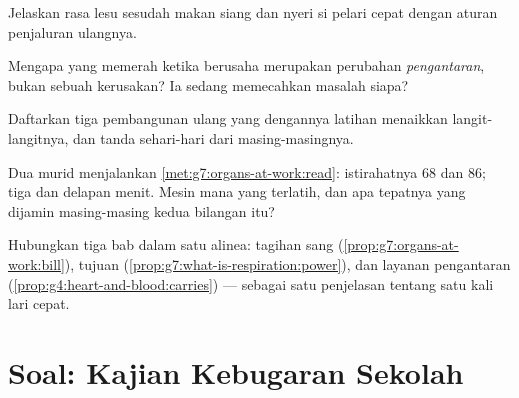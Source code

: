 \begin{exercise}[$\star\star$]\label{exo:g7:organs-at-work:8}
Jelaskan rasa lesu sesudah makan siang dan nyeri  si pelari
cepat dengan aturan penjaluran ulangnya.
\end{exercise}

\begin{exercise}[$\star\star$]\label{exo:g7:organs-at-work:9}
Mengapa  yang memerah ketika berusaha merupakan perubahan
\emph{pengantaran}, bukan sebuah kerusakan? Ia sedang memecahkan
masalah siapa?
\end{exercise}

\begin{exercise}[$\star\star$]\label{exo:g7:organs-at-work:10}
Daftarkan tiga pembangunan ulang yang dengannya latihan menaikkan
langit-langitnya, dan tanda sehari-hari dari masing-masingnya.
\end{exercise}

\begin{exercise}[$\star\star$]\label{exo:g7:organs-at-work:11}
Dua murid menjalankan \cref{met:g7:organs-at-work:read}: 
istirahatnya $68$ dan $86$;  tiga dan delapan menit. Mesin
mana yang terlatih, dan apa tepatnya yang dijamin masing-masing kedua
bilangan itu?
\end{exercise}

\begin{exercise}[$\star\star\star$]\label{exo:g7:organs-at-work:12}
Hubungkan tiga bab dalam satu alinea: tagihan sang 
(\cref{prop:g7:organs-at-work:bill}), tujuan 
(\cref{prop:g7:what-is-respiration:power}), dan layanan pengantaran
(\cref{prop:g4:heart-and-blood:carries}) --- sebagai satu penjelasan
tentang satu kali lari cepat.
\end{exercise}

\section{Soal: Kajian Kebugaran Sekolah}

